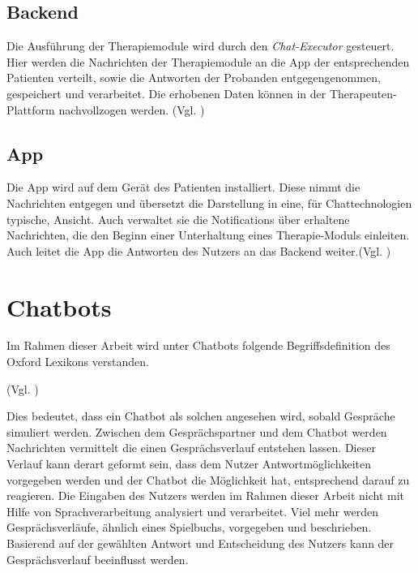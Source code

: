 \subsection{Backend}
Die Ausführung der Therapiemodule wird durch den \emph{Chat-Executor} gesteuert. Hier werden die Nachrichten der Therapiemodule an die App der entsprechenden Patienten verteilt, sowie die Antworten der Probanden entgegengenommen, gespeichert und verarbeitet. Die erhobenen Daten können in der Therapeuten-Plattform nachvollzogen werden. (Vgl. \cite[51\psq]{ben})

\subsection{App}
Die App wird auf dem Gerät des Patienten installiert. Diese nimmt die Nachrichten entgegen und übersetzt die Darstellung in eine, für Chattechnologien typische, Ansicht. Auch verwaltet sie die Notifications über erhaltene Nachrichten, die den Beginn einer Unterhaltung eines Therapie-Moduls einleiten. Auch leitet die App die Antworten des Nutzers an das Backend weiter.(Vgl. \cite[51\psq]{ben})

\section{Chatbots}

Im Rahmen dieser Arbeit wird unter Chatbots folgende Begriffsdefinition des Oxford Lexikons verstanden.

(Vgl. \cite{chatbotD24:online})

Dies bedeutet, dass ein Chatbot als solchen angesehen wird, sobald Gespräche simuliert werden. Zwischen dem Gesprächspartner und dem Chatbot werden Nachrichten vermittelt die einen Gesprächsverlauf entstehen lassen. Dieser Verlauf kann derart geformt sein, dass dem Nutzer Antwortmöglichkeiten vorgegeben werden und der Chatbot die Möglichkeit hat, entsprechend darauf zu reagieren. Die Eingaben des Nutzers werden im Rahmen dieser Arbeit nicht mit Hilfe von Sprachverarbeitung analysiert und verarbeitet. Viel mehr werden Gesprächsverläufe, ähnlich eines Spielbuchs, vorgegeben und beschrieben. Basierend auf der gewählten Antwort und Entscheidung des Nutzers kann der Gesprächsverlauf beeinflusst werden.